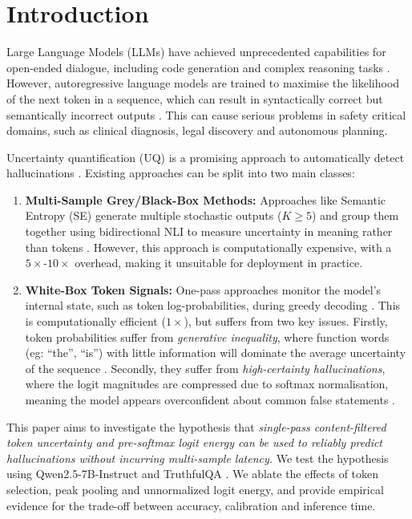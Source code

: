 \documentclass[10pt,twocolumn]{article}
\begin{document}
\section{Introduction}
Large Language Models (LLMs) have achieved unprecedented capabilities for open-ended dialogue, including code generation and complex reasoning tasks \cite{farquhar2024detecting}. However, autoregressive language models are trained to maximise the likelihood of the next token in a sequence, which can result in syntactically correct but semantically incorrect outputs \cite{lin2021truthfulqa}. This can cause serious problems in safety critical domains, such as clinical diagnosis, legal discovery and autonomous planning.

Uncertainty quantification (UQ) is a promising approach to automatically detect hallucinations \cite{kuhn2023semantic}. Existing approaches can be split into two main classes:
\begin{enumerate}
    \item \textbf{Multi-Sample Grey/Black-Box Methods:} Approaches like Semantic Entropy (SE) generate multiple stochastic outputs ($K \geq 5$) and group them together using bidirectional NLI to measure uncertainty in meaning rather than tokens \cite{kuhn2023semantic,farquhar2024detecting}. However, this approach is computationally expensive, with a $5 \times$-$10 \times$ overhead, making it unsuitable for deployment in practice.
    \item \textbf{White-Box Token Signals:} One-pass approaches monitor the model's internal state, such as token log-probabilities, during greedy decoding \cite{eliseev2024detecting,snyder2024early}. This is computationally efficient ($1 \times$), but suffers from two key issues. Firstly, token probabilities suffer from \textit{generative inequality}, where function words (eg: ``the'', ``is'') with little information will dominate the average uncertainty of the sequence \cite{duan2024shifting}. Secondly, they suffer from \textit{high-certainty hallucinations}, where the logit magnitudes are compressed due to softmax normalisation, meaning the model appears overconfident about common false statements \cite{zhao2024semantic}.
\end{enumerate}

This paper aims to investigate the hypothesis that \textit{single-pass content-filtered token uncertainty and pre-softmax logit energy can be used to reliably predict hallucinations without incurring multi-sample latency.} We test the hypothesis using Qwen2.5-7B-Instruct and TruthfulQA \cite{lin2021truthfulqa}. We ablate the effects of token selection, peak pooling and unnormalized logit energy, and provide empirical evidence for the trade-off between accuracy, calibration and inference time.
\end{document}
